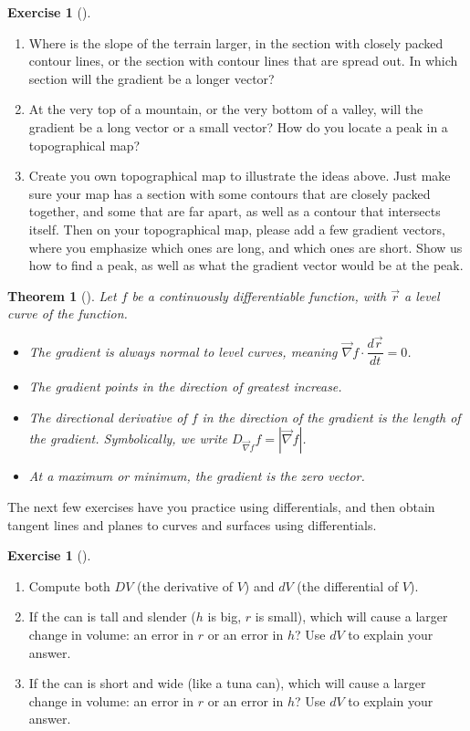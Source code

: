 \documentclass[10pt,]{book}
\theoremstyle{plain}
\newtheorem{theorem}{Theorem}[section]
\theoremstyle{definition}
\theoremstyle{definition}
\theoremstyle{definition}
\theoremstyle{definition}
\newtheorem{exploration}[project]{Exercise}
\theoremstyle{definition}
\numberwithin{equation}{section}
\begin{document}
\begin{exploration}[]\label{exploration-229}
\leavevmode%
\begin{enumerate}[font=\bfseries,label=(\alph*),ref=\alph*]
\item\label{task-613} Where is the slope of the terrain larger, in the section with closely packed contour lines, or the section with contour lines that are spread out. In which section will the gradient be a longer vector?%
\item\label{task-614} At the very top of a mountain, or the very bottom of a valley, will the gradient be a long vector or a small vector? How do you locate a peak in a topographical map?%
\item\label{task-615} Create you own topographical map to illustrate the ideas above. Just make sure your map has a section with some contours that are closely packed together, and some that are far apart, as well as a contour that intersects itself. Then on your topographical map, please add a few gradient vectors, where you emphasize which ones are long, and which ones are short. Show us how to find a peak, as well as what the gradient vector would be at the peak.%
\end{enumerate}
\end{exploration}
\begin{theorem}[{}]\label{theorem-7}
Let \(f\) be a continuously differentiable function, with \(\vec r\) a level curve of the function. \leavevmode%
\begin{itemize}[label=\textbullet]
\item{}The gradient is always normal to level curves, meaning \(\vec \nabla f\cdot \dfrac{d\vec r}{dt}=0\).%
\item{}The gradient points in the direction of greatest increase.%
\item{}The directional derivative of \(f\) in the direction of the gradient is the length of the gradient. Symbolically, we write \(D_{\vec \nabla f}f = |\vec \nabla f|\).%
\item{}At a maximum or minimum, the gradient is the zero vector.%
\end{itemize}
%
\end{theorem}
The next few exercises have you practice using differentials, and then obtain tangent lines and planes to curves and surfaces using differentials.%
\begin{exploration}[]\label{exploration-230}
\leavevmode%
\begin{enumerate}[font=\bfseries,label=(\alph*),ref=\alph*]
\item\label{task-616} Compute both \(DV\) (the derivative of \(V\)) and \(dV\) (the differential of \(V\)).%
\item\label{task-617} If the can is tall and slender (\(h\) is big, \(r\) is small), which will cause a larger change in volume: an error in \(r\) or an error in \(h\)? Use \(dV\) to explain your answer.%
\item\label{task-618} If the can is short and wide (like a tuna can), which will cause a larger change in volume: an error in \(r\) or an error in \(h\)? Use \(dV\) to explain your answer.%
\end{enumerate}
\end{exploration}
\end{document}
